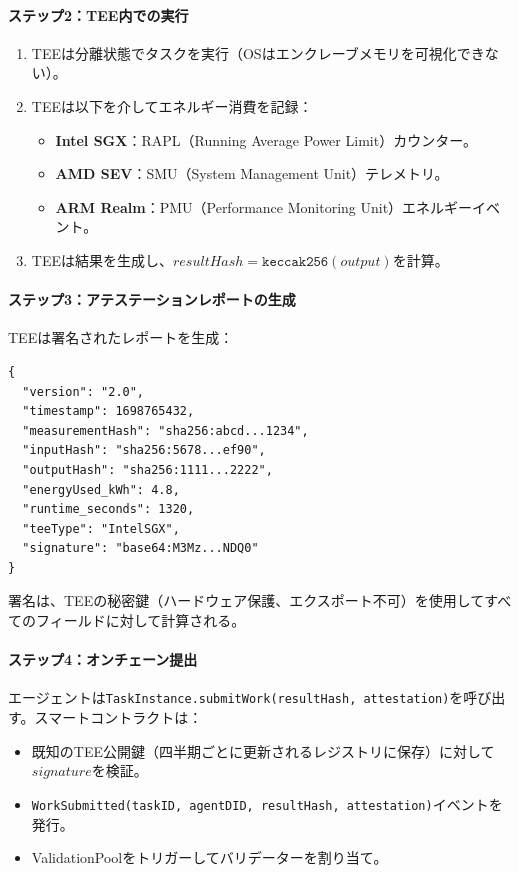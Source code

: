 \documentclass[11pt]{article}
\begin{document}
\paragraph{ステップ2：TEE内での実行}
\begin{enumerate}[noitemsep]
  \item TEEは分離状態でタスクを実行（OSはエンクレーブメモリを可視化できない）。
  \item TEEは以下を介してエネルギー消費を記録：
    \begin{itemize}[noitemsep]
      \item \textbf{Intel SGX}：RAPL（Running Average Power Limit）カウンター。
      \item \textbf{AMD SEV}：SMU（System Management Unit）テレメトリ。
      \item \textbf{ARM Realm}：PMU（Performance Monitoring Unit）エネルギーイベント。
    \end{itemize}
  \item TEEは結果を生成し、$resultHash = \texttt{keccak256}(output)$を計算。
\end{enumerate}

\paragraph{ステップ3：アテステーションレポートの生成}
TEEは署名されたレポートを生成：
\begin{verbatim}
{
  "version": "2.0",
  "timestamp": 1698765432,
  "measurementHash": "sha256:abcd...1234",
  "inputHash": "sha256:5678...ef90",
  "outputHash": "sha256:1111...2222",
  "energyUsed_kWh": 4.8,
  "runtime_seconds": 1320,
  "teeType": "IntelSGX",
  "signature": "base64:M3Mz...NDQ0"
}
\end{verbatim}
署名は、TEEの秘密鍵（ハードウェア保護、エクスポート不可）を使用してすべてのフィールドに対して計算される。

\paragraph{ステップ4：オンチェーン提出}
エージェントは\texttt{TaskInstance.submitWork(resultHash, attestation)}を呼び出す。スマートコントラクトは：
\begin{itemize}[noitemsep]
  \item 既知のTEE公開鍵（四半期ごとに更新されるレジストリに保存）に対して$signature$を検証。
  \item \texttt{WorkSubmitted(taskID, agentDID, resultHash, attestation)}イベントを発行。
  \item ValidationPoolをトリガーしてバリデーターを割り当て。
\end{itemize}
\end{document}
